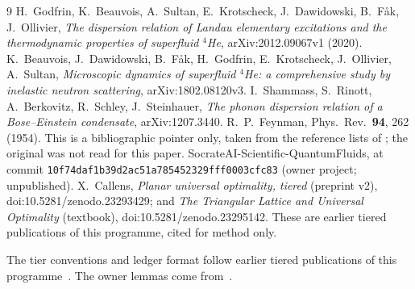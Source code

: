 \documentclass[11pt]{article}
\theoremstyle{remark}
\begin{document}
\begin{thebibliography}{9}
 H.~Godfrin, K.~Beauvois, A.~Sultan, E.~Krotscheck, J.~Dawidowski, B.~F{\aa}k, J.~Ollivier,
\emph{The dispersion relation of Landau elementary excitations and the thermodynamic properties of superfluid $^4$He},
arXiv:2012.09067v1 (2020).
 K.~Beauvois, J.~Dawidowski, B.~F{\aa}k, H.~Godfrin, E.~Krotscheck, J.~Ollivier, A.~Sultan,
\emph{Microscopic dynamics of superfluid $^4$He: a comprehensive study by inelastic neutron scattering},
arXiv:1802.08120v3.
 I.~Shammass, S.~Rinott, A.~Berkovitz, R.~Schley, J.~Steinhauer, \emph{The phonon dispersion relation
of a Bose--Einstein condensate}, arXiv:1207.3440.
 R.~P.~Feynman, Phys.\ Rev.\ \textbf{94}, 262 (1954). This is a bibliographic pointer only, taken
from the reference lists of \cite{godfrin,shammass}; the original was not read for this paper.
 SocrateAI-Scientific-QuantumFluids,  at commit
\texttt{10f74daf1b39d2ac51a785452329fff0003cfc83} (owner project; unpublished).
 X.~Callens, \emph{Planar universal optimality, tiered} (preprint v2), doi:10.5281/zenodo.23293429; and
\emph{The Triangular Lattice and Universal Optimality} (textbook), doi:10.5281/zenodo.23295142. These are earlier
tiered publications of this programme, cited for method only.
\end{thebibliography}
\noindent The tier conventions and ledger format follow earlier tiered publications of this programme~\cite{uo}. The
owner lemmas come from~\cite{qf}.
\end{document}
